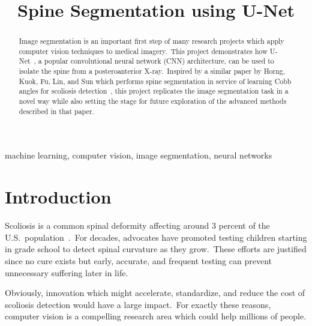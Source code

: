 \documentclass[conference]{IEEEtran}
\begin{document}
    \title{Spine Segmentation using U-Net}

    \author{
    }

    \maketitle

    \begin{abstract}
        Image segmentation is an important first step of many research projects which apply computer vision techniques to medical imagery.\ This project demonstrates how U-Net~\cite{ronneberger2015unet}, a popular convolutional neural network (CNN) architecture, can be used to isolate the spine from a posteroanterior X-ray.\ Inspired by a similar paper by Horng, Kuok, Fu, Lin, and Sun which performs spine segmentation in service of learning Cobb angles for scoliosis detection~\cite{cobb-angle-measurement-of-spine-from-x-ray-images-using-convolutional-neural-network}, this project replicates the image segmentation task in a novel way while also setting the stage for future exploration of the advanced methods described in that paper.
    \end{abstract}

    \begin{IEEEkeywords}
        machine learning, computer vision, image segmentation, neural networks
    \end{IEEEkeywords}

    \section{Introduction}\label{sec:introduction}

    Scoliosis is a common spinal deformity affecting around 3 percent of the U.S.\ population~\cite{scoliosis-media-and-community-guide}.\ For decades, advocates have promoted testing children starting in grade school to detect spinal curvature as they grow.\ These efforts are justified since no cure exists but early, accurate, and frequent testing can prevent unnecessary suffering later in life.

    Obviously, innovation which might accelerate, standardize, and reduce the cost of scoliosis detection would have a large impact.\ For exactly these reasons, computer vision is a compelling research area which could help millions of people.
\end{document}
